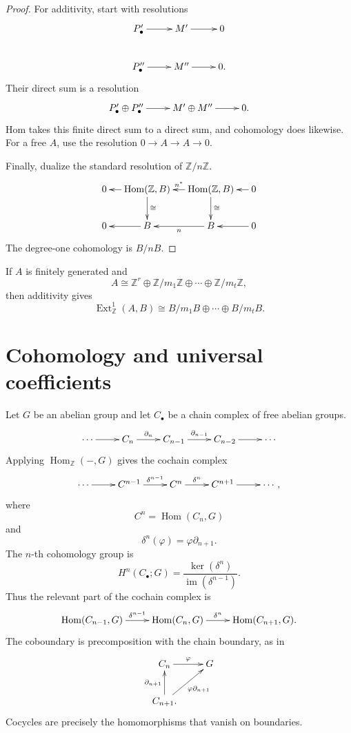 \begin{proof}
For additivity, start with resolutions
$$
\xymatrix{
P'_\bullet \ar[r]
  & M' \ar[r]
  & 0 \\
P''_\bullet \ar[r]
  & M'' \ar[r]
  & 0.
}
$$
Their direct sum is a resolution
$$
\xymatrix{
P'_\bullet\oplus P''_\bullet \ar[r]
  & M'\oplus M'' \ar[r]
  & 0.
}
$$
Hom takes this finite direct sum to a
direct sum, and cohomology does likewise.
For a free $A$, use the resolution
$0\to A\to A\to0$.

\noindent
Finally, dualize the standard resolution of
$\mathbb{Z}/n\mathbb{Z}$.
$$
\xymatrix@C=1.2em{
0
  & \operatorname{Hom}(\mathbb{Z},B)
    \ar[l]
    \ar[d]^\cong
  & \operatorname{Hom}(\mathbb{Z},B)
    \ar[l]_-{n^*}
    \ar[d]^\cong
  & 0 \ar[l] \\
0
  & B \ar[l]
  & B \ar[l]^-n
  & 0 \ar[l].
}
$$
The degree-one cohomology is $B/nB$.
\end{proof}

\noindent
If $A$ is finitely generated and
$$
A\cong
\mathbb{Z}^r
\oplus
\mathbb{Z}/m_1\mathbb{Z}
\oplus\cdots\oplus
\mathbb{Z}/m_t\mathbb{Z},
$$
then additivity gives
$$
\operatorname{Ext}^1_{\mathbb{Z}}(A,B)
\cong
B/m_1B\oplus\cdots\oplus B/m_tB.
$$
\section{Cohomology and universal
coefficients}
\label{at-section-universal-coefficients}

\noindent
Let $G$ be an abelian group and let
$C_\bullet$ be a chain complex of free
abelian groups.
$$
\xymatrix{
\cdots \ar[r]
  & C_n \ar[r]^-{\partial_n}
  & C_{n-1}
    \ar[r]^-{\partial_{n-1}}
  & C_{n-2} \ar[r]
  & \cdots
}
$$
Applying
$\operatorname{Hom}_{\mathbb{Z}}(-,G)$
gives the cochain complex
$$
\xymatrix{
\cdots \ar[r]
  & C^{n-1} \ar[r]^-{\delta^{n-1}}
  & C^n \ar[r]^-{\delta^n}
  & C^{n+1} \ar[r]
  & \cdots,
}
$$
where
$$
C^n=\operatorname{Hom}(C_n,G)
$$
and
$$
\delta^n(\varphi)
=
\varphi\partial_{n+1}.
$$
The $n$-th cohomology group is
$$
H^n(C_\bullet;G)
=
\frac{\ker(\delta^n)}
{\operatorname{im}(\delta^{n-1})}.
$$
Thus the relevant part of the cochain
complex is
$$
\xymatrix{
\operatorname{Hom}(C_{n-1},G)
  \ar[r]^-{\delta^{n-1}}
  & \operatorname{Hom}(C_n,G)
    \ar[r]^-{\delta^n}
  & \operatorname{Hom}(C_{n+1},G).
}
$$
The coboundary is precomposition with the
chain boundary, as in
$$
\xymatrix{
C_n \ar[r]^-\varphi
  & G \\
C_{n+1} \ar[u]^{\partial_{n+1}}
  \ar[ur]_{\varphi\partial_{n+1}}.
}
$$
Cocycles are precisely the homomorphisms
that vanish on boundaries.

